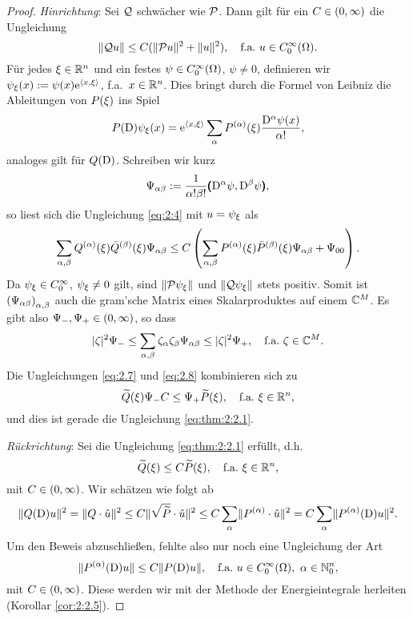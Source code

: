 \begin{proof}
{\em Hinrichtung}:
Sei $\mathcal Q$ schwächer wie $\mathcal P$.
Dann gilt für ein $C\in(0,\infty)$ die Ungleichung
\begin{equation}\label{eq:2:4}
\lVert\mathcal Q u\rVert\leq C(\lVert\mathcal P u\rVert^2+\lVert u\rVert^2),\quad\text{f.a.}~u\in C^\infty_0(\Omega).
\end{equation}
Für jedes $\xi\in\mathbb R^n$ und ein festes $\psi\in C^\infty_0(\Omega)$, $\psi\neq0$,
definieren wir $\psi_\xi(x):=\psi(x)\mathrm e^{\langle x,\xi\rangle}$, f.a.~$x\in\mathbb R^n$.
Dies bringt durch die Formel von Leibniz die Ableitungen von $P(\xi)$ ins Spiel
\begin{equation}\label{eq:2.5}
P(\mathrm D)\psi_\xi(x)=\mathrm e^{\langle x,\xi\rangle}\sum_\alpha P^{(\alpha)}(\xi)\frac{\mathrm D^\alpha\psi(x)}{\alpha!},
\end{equation}
analoges gilt für $Q(\mathrm D)$.
Schreiben wir kurz
\begin{equation}\label{eq:2.6}
\Psi_{\alpha\beta}:=\frac1{\alpha!\beta!}\pmb(\mathrm D^\alpha\psi,\mathrm D^\beta\psi\pmb),
\end{equation}
so liest sich die Ungleichung \eqref{eq:2:4} mit $u=\psi_\xi$ als
\begin{equation}\label{eq:2.7}
\sum_{\alpha,\beta}Q^{(\alpha)}(\xi)\bar{Q}^{(\beta)}(\xi)\Psi_{\alpha\beta}
\leq C\left(\sum_{\alpha,\beta}P^{(\alpha)}(\xi)\bar{P}^{(\beta)}(\xi)\Psi_{\alpha\beta}+\Psi_{00}\right).
\end{equation}
Da $\psi_\xi\in C^\infty_0$, $\psi_\xi\neq0$ gilt, sind $\lVert\mathcal P\psi_\xi\rVert$ und $\lVert\mathcal Q\psi_\xi\rVert$ stets positiv.
Somit ist $\left(\Psi_{\alpha\beta}\right)_{\alpha,\beta}$ auch die gram'sche Matrix
eines Skalarproduktes auf einem $\mathbb C^M$.
Es gibt also $\Psi_-,\Psi_+\in(0,\infty)$, so dass
\begin{equation}\label{eq:2.8}
\lvert\zeta\rvert^2\Psi_-\leq\sum_{\alpha,\beta}\zeta_\alpha\zeta_\beta\Psi_{\alpha\beta}\leq\lvert\zeta\rvert^2\Psi_+,
\quad\text{f.a.}~\zeta\in\mathbb C^M.
\end{equation}
Die Ungleichungen \eqref{eq:2.7} und \eqref{eq:2.8} kombinieren sich zu
\begin{equation}\label{eq:2.9}
\widetilde{Q}(\xi)\Psi_-C\leq\Psi_+\widetilde{P}(\xi),
\quad\text{f.a.}~\xi\in\mathbb R^n,
\end{equation}
und dies ist gerade die Ungleichung \eqref{eq:thm:2:2.1}.

{\em Rückrichtung}:
Sei die Ungleichung \eqref{eq:thm:2:2.1} erfüllt, d.h.
\begin{equation}\label{eq:2.10}
\widetilde{Q}(\xi)\leq C\widetilde{P}(\xi),
\quad\text{f.a.}~\xi\in\mathbb R^n,
\end{equation}
mit $C\in(0,\infty)$.
Wir schätzen wie folgt ab
\begin{equation}\label{eq:2.11}
\lVert Q(\mathrm D)u\rVert^2=\lVert Q\cdot\hat{u}\rVert^2\leq C\lVert\sqrt{\widetilde{P}}\cdot\hat{u}\rVert^2
\leq C\sum_{\alpha}\lVert P^{(\alpha)}\cdot\hat{u}\rVert^2=C\sum_\alpha\lVert P^{(\alpha)}(\mathrm D)u\rVert^2.
\end{equation}
Um den Beweis abzuschließen,
fehlte also nur noch eine Ungleichung der Art
\begin{equation}
\lVert P^{(\alpha)}(\mathrm D)u\rVert\leq C\lVert P(\mathrm D)u\rVert,
\quad\text{f.a.}~u\in C^\infty_0(\Omega),~\alpha\in\mathbb N^n_0,
\end{equation}
mit $C\in(0,\infty)$.
Diese werden wir mit der Methode der Energieintegrale herleiten (Korollar \ref{cor:2:2.5}).
\end{proof}

